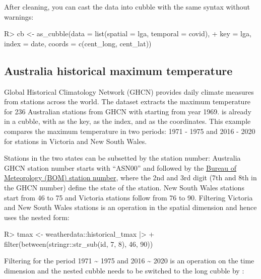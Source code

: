 \documentclass[
]{jss}
\begin{document}
After cleaning, you can cast the data into cubble with the same syntax without warnings:

\begin{CodeChunk}
\begin{CodeInput}
R> cb <- as_cubble(data = list(spatial = lga, temporal = covid),
+                 key = lga, index = date, coords = c(cent_long, cent_lat))
\end{CodeInput}
\end{CodeChunk}

\hypertarget{australia-historical-maximum-temperature}{%
\subsection{Australia historical maximum temperature}\label{australia-historical-maximum-temperature}}

Global Historical Climatology Network (GHCN) provides daily climate measures from stations across the world. The dataset  extracts the maximum temperature for 236 Australian stations from GHCN with starting from year 1969.  is already in a cubble, with  as the key,  as the index, and  as the coordinates. This example compares the maximum temperature in two periods: 1971 - 1975 and 2016 - 2020 for stations in Victoria and New South Wales.

Stations in the two states can be subsetted by the station number: Australia GHCN station number starts with ``ASN00'' and followed by the \href{http://www.bom.gov.au/climate/cdo/about/site-num.shtml}{Bureau of Meteorology (BOM) station number}, where the 2nd and 3rd digit (7th and 8th in the GHCN number) define the state of the station. New South Wales stations start from 46 to 75 and Victoria stations follow from 76 to 90. Filtering Victoria and New South Wales stations is an operation in the spatial dimension and hence uses the nested form:

\begin{CodeChunk}
\begin{CodeInput}
R> tmax <- weatherdata::historical_tmax |>
+   filter(between(stringr::str_sub(id, 7, 8), 46, 90))
\end{CodeInput}
\end{CodeChunk}

Filtering for the period 1971 \textasciitilde{} 1975 and 2016 \textasciitilde{} 2020 is an operation on the time dimension and the nested cubble needs to be switched to the long cubble by :
\end{document}
